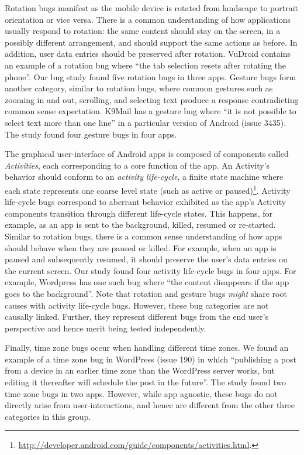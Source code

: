 Rotation bugs manifest as the mobile device is rotated from landscape to portrait orientation or vice versa. There is a common understanding of how applications usually respond to rotation: the same content should stay on the screen, in a possibly different arrangement, and should support the same actions as before. In addition, user data entries should be preserved after rotation. VuDroid contains an example of a rotation bug where ``the tab selection resets after rotating the phone''. Our bug study found five rotation bugs in three apps. Gesture bugs form another category, similar to rotation bugs, where common gestures such as zooming in and out, scrolling, and selecting text produce a response contradicting common sense expectation. K9Mail has a gesture bug where ``it is not possible to select text more than one line'' in a particular version of Android (issue 3435). The study found four gesture bugs in four apps.

The graphical user-interface of Android apps is composed of components called \textit{Activities}, each corresponding to a core function of the app. An Activity's behavior should conform to an \textit{activity life-cycle}, a finite state machine where each state represents one coarse level state (such as active or paused)\footnote{\url{http://developer.android.com/guide/components/activities.html}.}. 
Activity life-cycle bugs correspond to aberrant behavior exhibited as the app's Activity components transition through different life-cycle states.
This happens, for example, as an app is sent to the background, killed, resumed or re-started. Similar to rotation bugs, there is a common sense understanding of how apps should behave when they are paused or killed. %
For example, when an app is paused and subsequently resumed, it should preserve the user's data entries on the current screen. Our study found four activity life-cycle bugs in four apps. For example, Wordpress has one such bug where ``the content disappears if the app goes to the background''. Note that rotation and gesture bugs \textit{might} share root causes with activity life-cycle bugs. However, these bug categories are not causally linked. Further, they represent different bugs from the end user's perspective and hence merit being tested independently.

Finally, time zone bugs occur when handling different time zones. We found an example of a time zone bug in WordPress (issue 190) in which ``publishing a post from a device in an earlier time zone than the WordPress server works, but editing it thereafter will schedule the post in the future''. The study found two time zone bugs in two apps. However, while app agnostic, these bugs do not directly arise from user-interactions, and hence are different from the other three categories in this group. 

